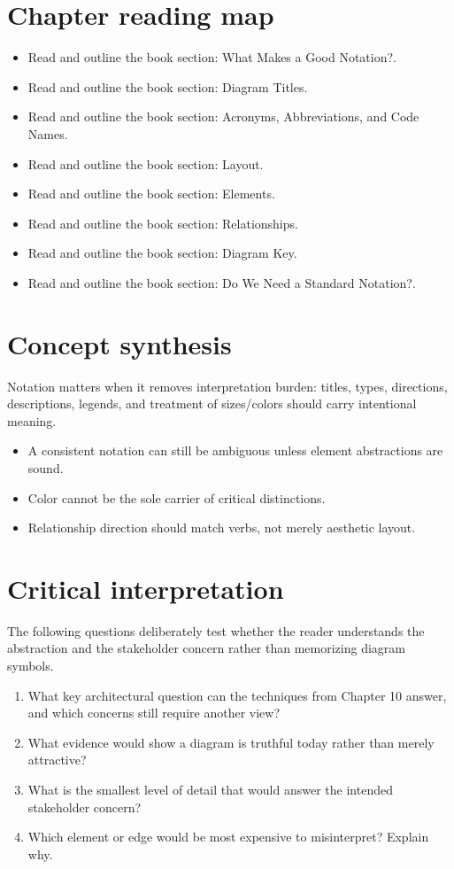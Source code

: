 \documentclass[10pt,letterpaper]{article}
\begin{document}
\section{Chapter reading map}
\begin{itemize}
\item Read and outline the book section: What Makes a Good Notation?.
\item Read and outline the book section: Diagram Titles.
\item Read and outline the book section: Acronyms, Abbreviations, and Code Names.
\item Read and outline the book section: Layout.
\item Read and outline the book section: Elements.
\item Read and outline the book section: Relationships.
\item Read and outline the book section: Diagram Key.
\item Read and outline the book section: Do We Need a Standard Notation?.
\end{itemize}

\section{Concept synthesis}
Notation matters when it removes interpretation burden: titles, types, directions, descriptions, legends, and treatment of sizes/colors should carry intentional meaning.

\begin{itemize}
\item A consistent notation can still be ambiguous unless element abstractions are sound.
\item Color cannot be the sole carrier of critical distinctions.
\item Relationship direction should match verbs, not merely aesthetic layout.
\end{itemize}

\section{Critical interpretation}
The following questions deliberately test whether the reader understands the abstraction and the stakeholder concern rather than memorizing diagram symbols.

\begin{enumerate}
\item What key architectural question can the techniques from Chapter 10 answer, and which concerns still require another view?
\item What evidence would show a diagram is truthful today rather than merely attractive?
\item What is the smallest level of detail that would answer the intended stakeholder concern?
\item Which element or edge would be most expensive to misinterpret? Explain why.
\end{enumerate}
\end{document}
